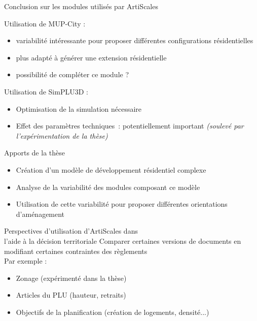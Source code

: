 \documentclass[xcolor=table]{beamer}
\begin{document}
\begin{frame}{Conclusion sur les modules utilisés par ArtiScales}
	\begin{block}{Utilisation de MUP-City :}
		\begin{itemize}
			\item variabilité intéressante pour proposer différentes configurations résidentielles
			\item plus adapté à générer une extension résidentielle
			\item possibilité de compléter ce module ? 			
		\end{itemize}
	\end{block}
	\begin{block}{Utilisation de SimPLU3D :}
		\begin{itemize}
			\item Optimisation de la simulation nécessaire
			\item Effet des paramètres techniques~: potentiellement important \textit{(soulevé par l'expérimentation de la thèse)}	\end{itemize}	
		\end{block}
\end{frame}
\begin{frame}{Apports de la thèse}
	\begin{itemize}
		\item Création d'un modèle de développement résidentiel complexe
		\item Analyse de la variabilité des modules composant ce modèle
		\item Utilisation de cette variabilité pour proposer différentes orientations d'aménagement
	\end{itemize}
\end{frame}

\begin{frame}{Perspectives d'utilisation d'ArtiScales dans \\l'aide à la décision territoriale}
	Comparer certaines versions de documents en modifiant certaines contraintes des règlements
	\\
	Par exemple : 
	\begin{itemize}
		\item Zonage (expérimenté dans la thèse)
		\item Articles du PLU (hauteur, retraits)
		\item Objectifs de la planification (création de logements, densité...)
	\end{itemize}
\end{frame}
\end{document}
